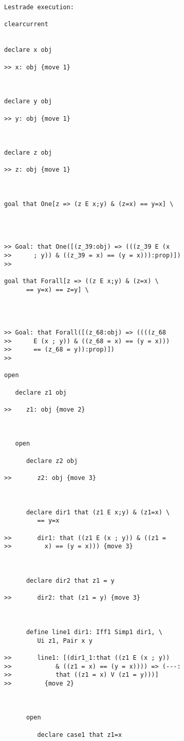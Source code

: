 \documentclass[12pt]{article}
\begin{document}
\begin{verbatim}Lestrade execution:

clearcurrent


declare x obj

>> x: obj {move 1}



declare y obj

>> y: obj {move 1}



declare z obj

>> z: obj {move 1}



goal that One[z => (z E x;y) & (z=x) == y=x] \
   



>> Goal: that One([(z_39:obj) => (((z_39 E (x
>>      ; y)) & ((z_39 = x) == (y = x))):prop)])
>>   

goal that Forall[z => ((z E x;y) & (z=x) \
      == y=x) == z=y] \
   



>> Goal: that Forall([(z_68:obj) => ((((z_68
>>      E (x ; y)) & ((z_68 = x) == (y = x)))
>>      == (z_68 = y)):prop)])
>>   

open

   declare z1 obj

>>    z1: obj {move 2}



   open

      declare z2 obj

>>       z2: obj {move 3}



      declare dir1 that (z1 E x;y) & (z1=x) \
         == y=x

>>       dir1: that ((z1 E (x ; y)) & ((z1 =
>>         x) == (y = x))) {move 3}



      declare dir2 that z1 = y

>>       dir2: that (z1 = y) {move 3}



      define line1 dir1: Iff1 Simp1 dir1, \
         Ui z1, Pair x y

>>       line1: [(dir1_1:that ((z1 E (x ; y))
>>            & ((z1 = x) == (y = x)))) => (---:
>>            that ((z1 = x) V (z1 = y)))]
>>         {move 2}



      open

         declare case1 that z1=x


\end{verbatim}
\end{document}
